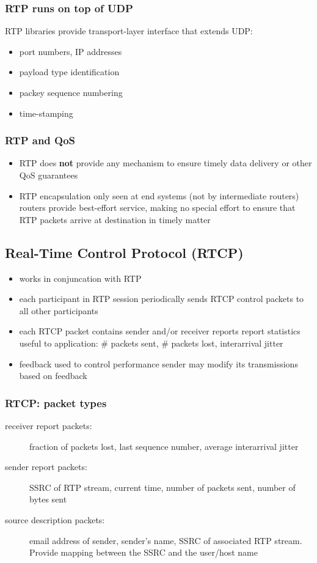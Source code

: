 \subsubsection{RTP runs on top of UDP}
RTP libraries provide transport-layer interface that extends UDP:
\begin{itemize}
	\item port numbers, IP addresses
	\item payload type identification
	\item packey sequence numbering
	\item time-stamping
\end{itemize}
\subsubsection{RTP and QoS}
\begin{itemize}
	\item RTP does \textbf{not} provide any mechanism to ensure timely data delivery or other QoS guarantees
	\item RTP encapsulation only seen at end systems (not by intermediate routers)
	\subitem routers provide best-effort service, making no special effort to ensure that RTP packets arrive at destination in timely matter
\end{itemize}

\subsection{Real-Time Control Protocol (RTCP)}\label{sec:rtcp}
\begin{itemize}
	\item works in conjuncation with RTP
	\item each participant in RTP session periodically sends RTCP control packets to all other participants
	\item each RTCP packet contains sender and/or receiver reports
	\subitem report statistics useful to application: \# packets sent, \# packets lost, interarrival jitter
	\item feedback used to control performance
	\subitem sender may modify its transmissions based on feedback
\end{itemize}
\subsubsection{RTCP: packet types}
\begin{description}
	\item[receiver report packets:] fraction of packets lost, last sequence number, average interarrival jitter
	\item[sender report packets:] SSRC of RTP stream, current time, number of packets sent, number of bytes sent
	\item[source description packets:] email address of sender, sender's name, SSRC of associated RTP stream. Provide mapping between the SSRC and the user/host name
\end{description}

